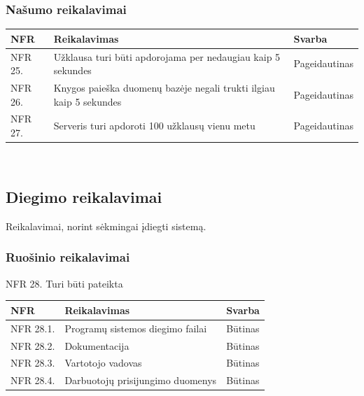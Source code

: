 \documentclass{VUMIFPSkursinis}
\begin{document}
   \subsubsection{Našumo reikalavimai}
   \noindent
   \begin{centering}
    	\begin{tabular}{ | p{} | p{} | p{} |}
    		\hline
   			NFR & Reikalavimas & Svarba       \\ \hline
		  	NFR 25. & Užklausa turi būti apdorojama per nedaugiau kaip 5 sekundes & Pageidautinas \\ \hline
            NFR 26. & Knygos paieška duomenų bazėje negali trukti ilgiau kaip 5 sekundes & Pageidautinas \\ \hline
            NFR 27. & Serveris turi apdoroti 100 užklausų vienu metu & Pageidautinas \\ \hline
   		\end{tabular}\\
    \end{centering}

\subsection{Diegimo reikalavimai}
Reikalavimai, norint sėkmingai įdiegti sistemą.
	\subsubsection{Ruošinio reikalavimai}
    \noindent
    NFR 28. Turi būti pateikta 
    
    \begin{centering}
    	\begin{tabular}{ | p{} | p{} | p{} |}
    		\hline
   			NFR & Reikalavimas & Svarba       \\ \hline
		  	NFR 28.1. & Programų sistemos diegimo failai & Būtinas \\ \hline
            NFR 28.2. & Dokumentacija & Būtinas \\ \hline
            NFR 28.3. & Vartotojo vadovas & Būtinas \\ \hline
            NFR 28.4. & Darbuotojų prisijungimo duomenys & Būtinas \\ \hline
   		\end{tabular}\\
    \end{centering}
    
\end{document}

